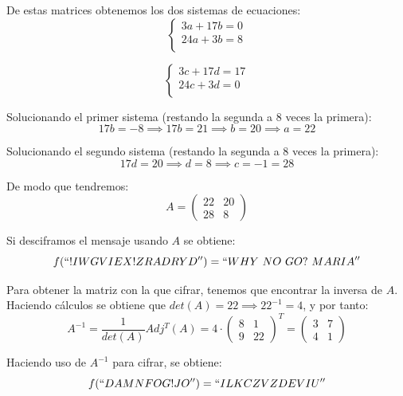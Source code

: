 \begin{problem}[3]
De estas matrices obtenemos los dos sistemas de ecuaciones:
\[
  \begin{cases}
    3a + 17b = 0\\
    24a + 3b = 8\\
  \end{cases}
\]

\[
  \begin{cases}
    3c + 17d = 17\\
    24c + 3d = 0\\
  \end{cases}
\]

Solucionando el primer sistema (restando la segunda a 8 veces la primera):
\[17b = -8 \implies 17b = 21 \implies b = 20 \implies a = 22\]

Solucionando el segundo sistema (restando la segunda a 8 veces la primera):
\[17d = 20 \implies d = 8 \implies c = -1 = 28\]

De modo que tendremos:
\[
	A =
	\left( \begin{array}{cc}
	22 & 20 \\
	28 & 8
	\end{array} \right)
\]

Si desciframos el mensaje usando $A$ se obtiene:
\[f(``!IWGVIEX!ZRADRYD'') = ``WHY\ NO\ GO?\ MARIA''\]

\spart
Para obtener la matriz con la que cifrar, tenemos que encontrar la inversa de $A$. Haciendo cálculos se obtiene que $det(A)=22 \implies 22^{-1} = 4$, y por tanto:
\[
	A^{-1} = \frac{1}{det(A)} Adj^T(A) =
	4·
	\left( \begin{array}{cc}
	8 & 1 \\
	9 & 22
	\end{array} \right)^T
	=
	\left( \begin{array}{cc}
	3 & 7 \\
	4 & 1
	\end{array} \right)
\]

Haciendo uso de $A^{-1}$ para cifrar, se obtiene:
\[f(``DAMN FOG! JO'')=``ILKCZVZDEVIU''\]

\end{problem}

